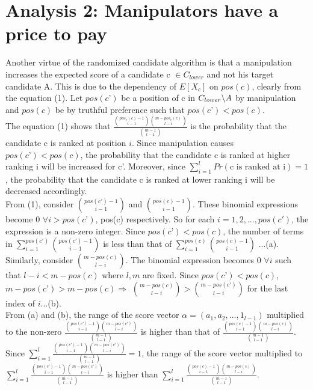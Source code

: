 \documentclass[letterpaper]{article} %
\begin{document}
\section{Analysis 2: Manipulators have a price to pay}
Another virtue of the randomized candidate algorithm is that a manipulation increases the expected score of a candidate c $\in C_{lower}$ and not his target candidate A. This is due to the dependency of $E[X_c]$ on $pos(c)$, clearly from the equation (1). Let $pos(c’)$ be a position of c in $C_{lower} \symbol{92}A$ by manipulation and $pos(c)$ be by truthful preference such that $pos(c’) < pos(c)$. \\
The equation (1) shows that $ \frac{\binom{pos_v(c)-1}{i-1}\binom{m-pos_v(c)}{l-i}}{\binom{m-1}{l-1}}$ is the probability that the candidate c is ranked at position $i$. Since manipulation causes $pos(c’) < pos(c)$, the probability that the candidate c is ranked at higher ranking i will be increased for c'. Moreover, since $\sum_{i=1}^l Pr(\text{c is ranked at i}) =1$,  the probability that the candidate c is ranked at lower ranking i will be decreased accordingly.\\
From (1), consider $\binom{pos(c')-1}{i-1}$ and $\binom{pos(c)-1}{i-1}$. These binomial expressions become 0 $\forall i > pos(c’)$, pos(c) respectively. So for each $i= 1,2,...,pos(c')$,  the expression is a non-zero integer. Since $pos(c’) < pos(c)$,  the number of terms in $\sum_{i=1}^{pos(c')} \binom{pos(c')-1}{i-1}$ is less than that of $\sum_{i=1}^{pos(c)} \binom{pos(c)-1}{i-1}$ ...(a). Similarly, consider $\binom{m-pos(c)}{l-i}$. The binomial expression becomes 0 $\forall i$ such that $l-i < m-pos(c)$ where $l,m$ are fixed. Since $pos(c’) < pos(c)$, $m-pos(c’) > m-pos(c) \Rightarrow $ $\binom{m-pos(c)}{l-i} > \binom{m-pos(c')}{l-i}$ for the last index of $i$...(b).\\
From (a) and (b), the range of the score vector $\alpha =  (a_1, a_2, ..., 1_{l-1})$ multiplied to the non-zero $\frac{\binom{pos(c')-1}{i-1} \binom{m-pos(c')}{l-i} }{\binom{m-1}{l-1}}$ is higher than that of $\frac{\binom{pos(c)-1}{i-1} \binom{m-pos(c)}{l-i} }{\binom{m-1}{l-1}}$. Since $\sum_{i=1}^{l} \frac{\binom{pos(c')-1}{i-1} \binom{m-pos(c')}{l-i}}{\binom{m-1}{l-1}} = 1$, the range of the score vector multiplied to $\sum_{i=1}^{l} \frac{\binom{pos(c')-1}{i-1} \binom{m-pos(c')}{l-i}}{\binom{m-1}{l-1}}$ is higher than $\sum_{i=1}^{l} \frac{\binom{pos(c)-1}{i-1} \binom{m-pos(c)}{l-i}}{\binom{m-1}{l-1}}$.
\end{document}
